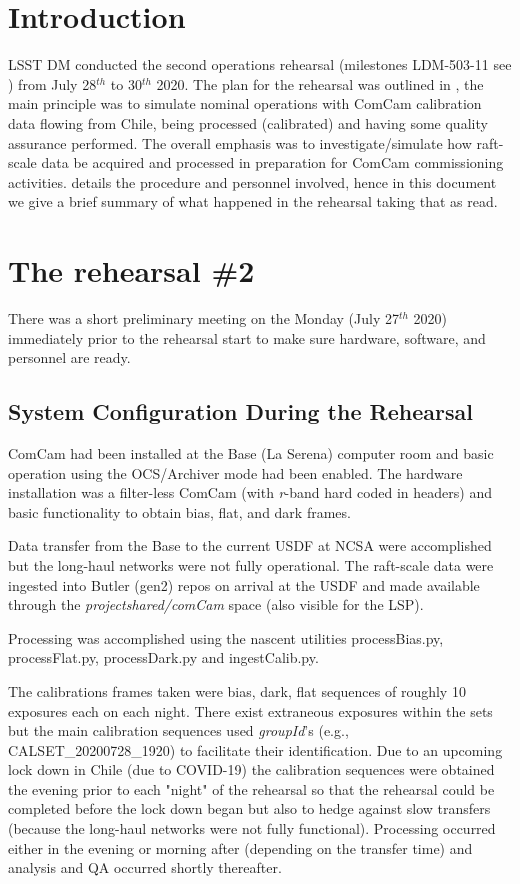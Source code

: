 \section{Introduction} \label{sec:intro}

LSST DM conducted the second operations rehearsal (milestones LDM-503-11 see ) from July 28$^{th}$ to 30$^{th}$ 2020.
The plan for the rehearsal was outlined in , the main principle was to simulate
nominal operations with ComCam calibration data flowing from Chile, being processed (calibrated)
and having some quality assurance performed.  The overall emphasis was to investigate/simulate how
raft-scale data be acquired and processed in preparation for ComCam commissioning activities.
 details the procedure and personnel involved,
hence in this document we give a brief summary of what  happened in the rehearsal taking that as read.


\section{The rehearsal \#2}

There was a short preliminary meeting on the Monday (July 27$^{th}$ 2020) immediately prior to the
rehearsal start to make sure hardware, software, and personnel are ready.

\subsection{System Configuration During the Rehearsal} \label{sec:setup}

ComCam had been installed at the Base (La Serena) computer room and basic operation using the OCS/Archiver
mode had been enabled.  The hardware installation was a filter-less ComCam (with {\it r}-band hard coded
in headers) and basic functionality to obtain bias, flat, and dark frames.

Data transfer from the Base to the current USDF at NCSA were accomplished but the long-haul networks were not
fully operational.  The raft-scale data were ingested into Butler (gen2) repos on arrival at the USDF
and made available through the {\it \/project\/shared/comCam} space (also visible for the LSP).

Processing was accomplished using the nascent utilities processBias.py, processFlat.py, processDark.py
and ingestCalib.py.

The calibrations frames taken were bias, dark, flat sequences of roughly 10 exposures each on each night.
There exist extraneous exposures within the sets but the main calibration sequences used {\it groupId}'s
(e.g., CALSET\_20200728\_1920) to facilitate their identification.  Due to an upcoming lock down in Chile
(due to COVID-19) the calibration sequences were obtained the evening prior to each "night" of the
rehearsal so that the rehearsal could be completed before the lock down began but also to hedge against
slow transfers (because the long-haul networks were not fully functional).  Processing occurred either
in the evening or morning after (depending on the transfer time) and analysis and QA occurred
shortly thereafter.

